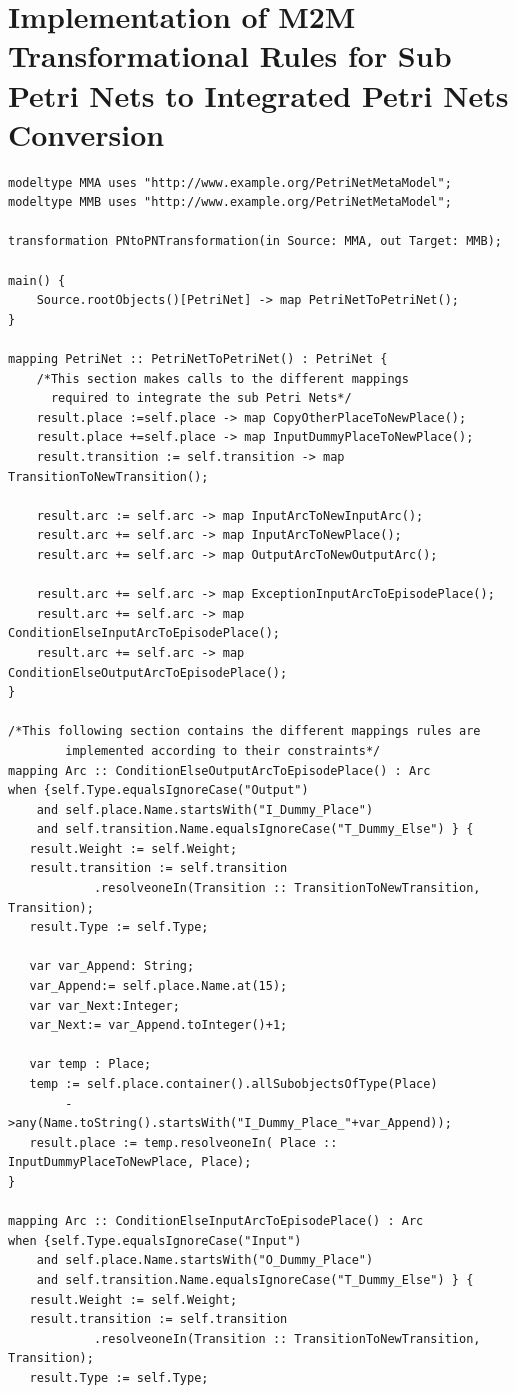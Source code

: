 \section{Implementation of M2M Transformational Rules for Sub Petri Nets to Integrated Petri Nets Conversion}\label{m2mrules}
\begin{verbatim}
modeltype MMA uses "http://www.example.org/PetriNetMetaModel";
modeltype MMB uses "http://www.example.org/PetriNetMetaModel";

transformation PNtoPNTransformation(in Source: MMA, out Target: MMB);

main() {
	Source.rootObjects()[PetriNet] -> map PetriNetToPetriNet();
}

mapping PetriNet :: PetriNetToPetriNet() : PetriNet {
	/*This section makes calls to the different mappings 
	  required to integrate the sub Petri Nets*/
	result.place :=self.place -> map CopyOtherPlaceToNewPlace();
	result.place +=self.place -> map InputDummyPlaceToNewPlace();
	result.transition := self.transition -> map TransitionToNewTransition();
	
	result.arc := self.arc -> map InputArcToNewInputArc();
	result.arc += self.arc -> map InputArcToNewPlace();
	result.arc += self.arc -> map OutputArcToNewOutputArc();
	
	result.arc += self.arc -> map ExceptionInputArcToEpisodePlace();
	result.arc += self.arc -> map ConditionElseInputArcToEpisodePlace();
	result.arc += self.arc -> map ConditionElseOutputArcToEpisodePlace();
}

/*This following section contains the different mappings rules are 
		implemented according to their constraints*/
mapping Arc :: ConditionElseOutputArcToEpisodePlace() : Arc
when {self.Type.equalsIgnoreCase("Output") 
	and self.place.Name.startsWith("I_Dummy_Place")
	and self.transition.Name.equalsIgnoreCase("T_Dummy_Else") } {
   result.Weight := self.Weight;
   result.transition := self.transition
			.resolveoneIn(Transition :: TransitionToNewTransition, Transition);
   result.Type := self.Type;
      
   var var_Append: String;
   var_Append:= self.place.Name.at(15);
   var var_Next:Integer;
   var_Next:= var_Append.toInteger()+1;
   
   var temp : Place;
   temp := self.place.container().allSubobjectsOfType(Place)
		->any(Name.toString().startsWith("I_Dummy_Place_"+var_Append));
   result.place := temp.resolveoneIn( Place :: InputDummyPlaceToNewPlace, Place);
}

mapping Arc :: ConditionElseInputArcToEpisodePlace() : Arc
when {self.Type.equalsIgnoreCase("Input") 
	and self.place.Name.startsWith("O_Dummy_Place")
	and self.transition.Name.equalsIgnoreCase("T_Dummy_Else") } {
   result.Weight := self.Weight;
   result.transition := self.transition
			.resolveoneIn(Transition :: TransitionToNewTransition, Transition);
   result.Type := self.Type;
     

\end{verbatim}
